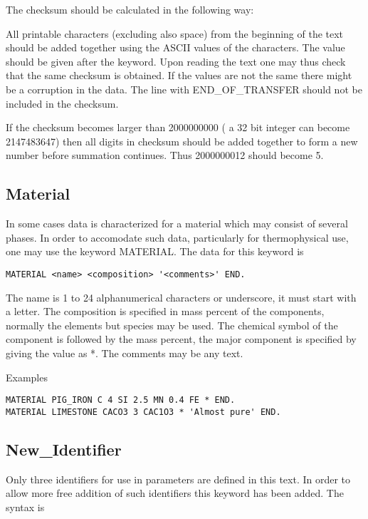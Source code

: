 \documentclass[12pt]{article}
\begin{document}
The checksum should be calculated in the following way:

All printable characters (excluding also space) from the beginning of
the text should be added together using the ASCII values of the
characters. The value should be given after the keyword. Upon reading
the text one may thus check that the same checksum is obtained. If the
values are not the same there might be a corruption in the data. The
line with END\_OF\_TRANSFER should not be included in the checksum.

If the checksum becomes larger than 2000000000 ( a 32 bit integer can
become 2147483647) then all digits in checksum should be added
together to form a new number before summation continues. Thus
2000000012 should become 5.

\subsection{Material}\label{sec:material}

In some cases data is characterized for a material which may consist
of several phases. In order to accomodate such data, particularly for
thermophysical use, one may use the keyword MATERIAL. The data for this
keyword is

\begin{verbatim}
MATERIAL <name> <composition> '<comments>' END.
\end{verbatim}

The name is 1 to 24 alphanumerical characters or underscore, it must
start with a letter. The composition is specified in mass percent of
the components, normally the elements but species may be used. The
chemical symbol of the component is followed by the mass percent, the
major component is specified by giving the value as *. The comments
may be any text. 

Examples

\begin{verbatim}
MATERIAL PIG_IRON C 4 SI 2.5 MN 0.4 FE * END.
MATERIAL LIMESTONE CACO3 3 CAC1O3 * 'Almost pure' END.
\end{verbatim}

\subsection{New\_Identifier}\label{sec:newid}

Only three identifiers for use in parameters are defined in this text.
In order to allow more free addition of such identifiers this keyword
has been added. The syntax is
\end{document}
